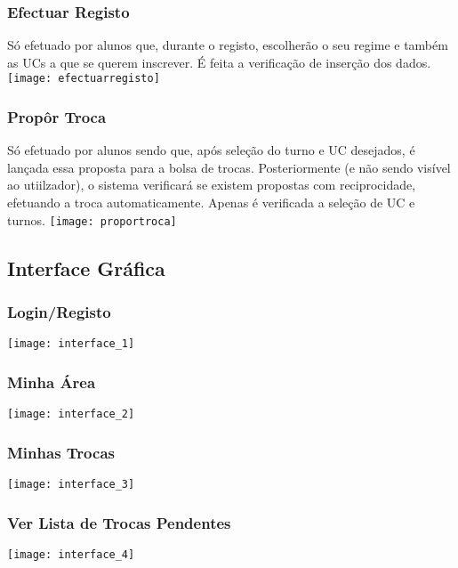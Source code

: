 \documentclass[a4paper]{article}
\begin{document}
\subsubsection{Efectuar Registo}
Só efetuado por alunos que, durante o registo, escolherão o seu regime e também as UCs a que se querem inscrever. É feita a verificação de inserção dos dados.
\texttt{[image: efectuarregisto]}\break

\subsubsection{Propôr Troca}
Só efetuado por alunos sendo que, após seleção do turno e UC desejados, é lançada essa proposta para a bolsa de trocas. Posteriormente (e não sendo visível ao utiilzador), o sistema verificará se existem propostas com reciprocidade, efetuando a troca automaticamente. Apenas é verificada a seleção de UC e turnos.
\texttt{[image: proportroca]}\break



\subsection{Interface Gráfica}

\subsubsection{Login/Registo}
\texttt{[image: interface\_1]}\break

\subsubsection{Minha Área}
\texttt{[image: interface\_2]}\break

\subsubsection{Minhas Trocas}
\texttt{[image: interface\_3]}\break

\subsubsection{Ver Lista de Trocas Pendentes}
\texttt{[image: interface\_4]}\break



\pagebreak
\end{document}
